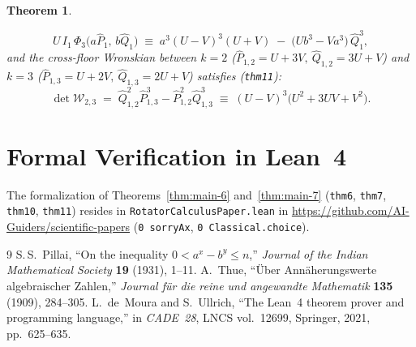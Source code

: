 \documentclass[11pt,a4paper]{article}
\theoremstyle{plain}
\newtheorem{theorem}{Theorem}[section]
\theoremstyle{definition}
\begin{document}
\begin{theorem}
\begin{enumerate}[label=\textbf{(\roman*)},leftmargin=*]
  \begin{equation}
    \label{eq:root-free-cubic-compression}
    U\,I_1\,\Phi_3\bigl(a\widehat{P}_1,\,b\widehat{Q}_1\bigr) \;\equiv\; a^3(U-V)^3(U+V) \;-\; \bigl(U b^3 - V a^3\bigr)\,\widehat{Q}_1^3,
  \end{equation}
  and the cross-floor Wronskian between $k=2$ ($\widehat{P}_{1,2}=U+3V,\ \widehat{Q}_{1,2}=3U+V$) and $k=3$ ($\widehat{P}_{1,3}=U+2V,\ \widehat{Q}_{1,3}=2U+V$) satisfies (\texttt{thm11}):
  \begin{equation}
    \label{eq:cross-floor-wronskian}
    \det\mathcal{W}_{2,3} \;=\; \widehat{Q}_{1,2}^2\widehat{P}_{1,3}^3 - \widehat{P}_{1,2}^2\widehat{Q}_{1,3}^3 \;\equiv\; (U - V)^3\bigl(U^2 + 3UV + V^2\bigr).
  \end{equation}
\end{enumerate}
\end{theorem}

\section{Formal Verification in Lean~4}
\label{sec:lean4}

The formalization of Theorems~\ref{thm:main-6} and~\ref{thm:main-7} (\texttt{thm6}, \texttt{thm7}, \texttt{thm10}, \texttt{thm11}) resides in \texttt{RotatorCalculusPaper.lean} in \url{https://github.com/AI-Guiders/scientific-papers} (\texttt{0 sorryAx}, \texttt{0 Classical.choice}).

\begin{thebibliography}{9}
S.\,S.~Pillai, ``On the inequality $0 < a^x - b^y \le n$,'' \emph{Journal of the Indian Mathematical Society} \textbf{19} (1931), 1--11.
A.~Thue, ``\"Uber Ann\"aherungswerte algebraischer Zahlen,'' \emph{Journal f\"ur die reine und angewandte Mathematik} \textbf{135} (1909), 284--305.
L.~de~Moura and S.~Ullrich, ``The Lean~4 theorem prover and programming language,'' in \emph{CADE~28}, LNCS vol.~12699, Springer, 2021, pp.~625--635.
\end{thebibliography}
\end{document}
